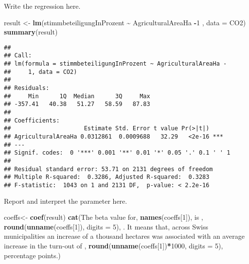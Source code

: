 \documentclass[
]{book}
\newenvironment{Shaded}{\begin{snugshade}}{\end{snugshade}}
\newcommand{\AttributeTok}[1]{\textcolor[rgb]{0.13,0.29,0.53}{#1}}
\newcommand{\DecValTok}[1]{\textcolor[rgb]{0.00,0.00,0.81}{#1}}
\newcommand{\FunctionTok}[1]{\textcolor[rgb]{0.13,0.29,0.53}{\textbf{#1}}}
\newcommand{\NormalTok}[1]{#1}
\newcommand{\OtherTok}[1]{\textcolor[rgb]{0.56,0.35,0.01}{#1}}
\newcommand{\SpecialCharTok}[1]{\textcolor[rgb]{0.81,0.36,0.00}{\textbf{#1}}}
\newcommand{\StringTok}[1]{\textcolor[rgb]{0.31,0.60,0.02}{#1}}
\begin{document}
Write the regression here.

\begin{Shaded}
\begin{Highlighting}[]
\NormalTok{result }\OtherTok{\textless{}{-}} \FunctionTok{lm}\NormalTok{(stimmbeteiligungInProzent }\SpecialCharTok{\textasciitilde{}}\NormalTok{ AgriculturalAreaHa }\SpecialCharTok{{-}}\DecValTok{1}\NormalTok{ , }\AttributeTok{data =}\NormalTok{ CO2)}
\FunctionTok{summary}\NormalTok{(result)}
\end{Highlighting}
\end{Shaded}

\begin{verbatim}
## 
## Call:
## lm(formula = stimmbeteiligungInProzent ~ AgriculturalAreaHa - 
##     1, data = CO2)
## 
## Residuals:
##     Min      1Q  Median      3Q     Max 
## -357.41   40.38   51.27   58.59   87.83 
## 
## Coefficients:
##                     Estimate Std. Error t value Pr(>|t|)    
## AgriculturalAreaHa 0.0312861  0.0009688   32.29   <2e-16 ***
## ---
## Signif. codes:  0 '***' 0.001 '**' 0.01 '*' 0.05 '.' 0.1 ' ' 1
## 
## Residual standard error: 53.71 on 2131 degrees of freedom
## Multiple R-squared:  0.3286, Adjusted R-squared:  0.3283 
## F-statistic:  1043 on 1 and 2131 DF,  p-value: < 2.2e-16
\end{verbatim}

Report and interpret the parameter here.

\begin{Shaded}
\begin{Highlighting}[]
\NormalTok{coeffs}\OtherTok{\textless{}{-}} \FunctionTok{coef}\NormalTok{(result)}
\FunctionTok{cat}\NormalTok{(}\StringTok{\textquotesingle{}The beta value for\textquotesingle{}}\NormalTok{, }\FunctionTok{names}\NormalTok{(coeffs[}\DecValTok{1}\NormalTok{]), }\StringTok{\textquotesingle{} is \textquotesingle{}}\NormalTok{, }\FunctionTok{round}\NormalTok{(}\FunctionTok{unname}\NormalTok{(coeffs[}\DecValTok{1}\NormalTok{]), }\AttributeTok{digits =} \DecValTok{5}\NormalTok{), }\StringTok{\textquotesingle{}. It means that, across Swiss municipalities an increase of a thousand hectares was associated with an average increase in the turn{-}out of \textquotesingle{}}\NormalTok{, }\FunctionTok{round}\NormalTok{(}\FunctionTok{unname}\NormalTok{(coeffs[}\DecValTok{1}\NormalTok{])}\SpecialCharTok{*}\DecValTok{1000}\NormalTok{, }\AttributeTok{digits =} \DecValTok{5}\NormalTok{), }\StringTok{\textquotesingle{} percentage points.\textquotesingle{}}\NormalTok{)}
\end{Highlighting}
\end{Shaded}
\end{document}
